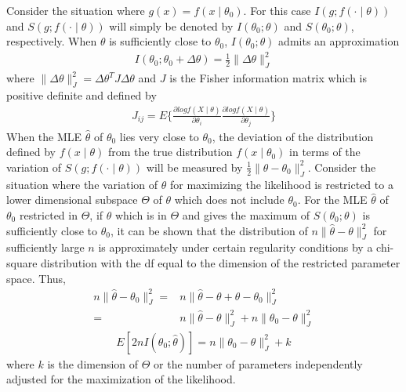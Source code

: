 \documentclass{article}
\begin{document}
Consider the situation where $g(x)=f(x\mid \theta_0)$. For this case $I(g;f(\cdot \mid \theta))$and $S(g;f(\cdot \mid \theta))$ will simply be denoted by $I(\theta_0;\theta)$ and $S(\theta_0;\theta)$, respectively. When $\theta$ is sufficiently close to $\theta_0$, $I(\theta_0;\theta)$ admits an approximation
\begin{align*}
I(\theta_0;\theta_0+\Delta \theta)=\frac{1}{2}\parallel \Delta \theta \parallel _J^2
\end{align*}
where $\parallel \Delta \theta \parallel _J^2=\Delta \theta^T J \Delta \theta$ and $J$ is the Fisher information matrix which is positive definite and defined by
\begin{align*}
J_{ij}=E\{\frac{\partial log f(X\mid \theta)}{\partial \theta_i}\frac{\partial log f(X\mid \theta)}{\partial \theta_j}\}
\end{align*}
When the MLE $\hat{\theta}$ of $\theta_0$ lies very close to $\theta_0$, the deviation of the distribution defined by $f(x\mid \theta)$ from the true distribution $f(x\mid \theta_0)$ in terms of the variation of $S(g;f(\cdot \mid \theta))$ will be measured by $\frac{1}{2}\parallel \theta-\theta_0 \parallel _J^2$. Consider the situation where the variation of $\theta$ for maximizing the likelihood is restricted to a lower dimensional subspace $\Theta$ of $\theta$ which does not include $\theta_0$. For the MLE $\hat{\theta}$ of $\theta_0$ restricted in $\Theta$, if $\theta$ which is in $\Theta$ and gives the maximum of $S(\theta_0;\theta)$ is sufficiently close to $\theta_0$, it can be shown that the distribution of $n\parallel \hat{\theta}-\theta \parallel _J^2$ for sufficiently large $n$ is approximately under certain regularity conditions by a chi-square distribution with the df equal to the dimension of the restricted parameter space. Thus,
\begin{align*}
n\parallel \hat{\theta}-\theta_0 \parallel _J^2=&n\parallel \hat{\theta}-\theta+\theta-\theta_0 \parallel _J^2\\=&n\parallel \hat{\theta}-\theta \parallel _J^2+n\parallel \theta_0-\theta \parallel _J^2
\end{align*}
\begin{align}
E[2n I(\theta_0;\hat{\theta})]=n\parallel \theta_0-\theta \parallel _J^2+k
\end{align}
where $k$ is the dimension of $\Theta$ or the number of parameters independently adjusted for the maximization of the likelihood.\\
\end{document}
